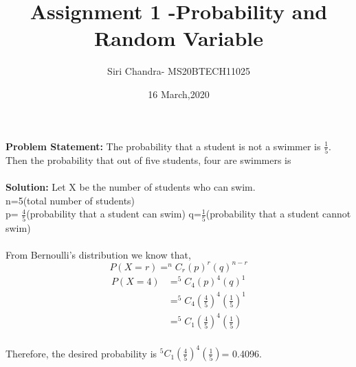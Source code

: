 \documentclass[journel,12pt]{IEEEtran}
\title{Assignment 1 -Probability and Random Variable}
\author{Siri Chandra- MS20BTECH11025}
\date{16 March,2020}
\begin{document}
 
 \maketitle
\textbf{Problem Statement:} The probability that a student is not a swimmer is $\frac{1}{5}$. Then the probability that out of five students, four are swimmers is
\\
\\

\textbf{Solution:} Let X be the number of students who can swim.
\\
n=5(total number of students)
\\
p= $\frac{4}{5}$(probability that a student can swim)
q=$\frac{1}{5}$(probability that a student cannot swim)
\\
\\
From Bernoulli's distribution we know that,
\begin{equation}
    P(X=r)=^{n}C_r(p)^{r}(q)^{n-r}
\end{equation}
\begin{equation}
\begin{split}
   P(X=4) & =^5C_4(p)^{4}(q)^{1}
   \\& = ^5C_4\left(\frac{4}{5}\right)^{4}\left(\frac{1}{5}\right)^{1}
   \\& =^5C_1\left(\frac{4}{5}\right)^{4}\left(\frac{1}{5}\right)
\end{split}
\end{equation}
\\
Therefore, the desired probability is $^5C_1\left(\frac{4}{5}\right)^{4}\left(\frac{1}{5}\right)$= 0.4096.
\end{document}
